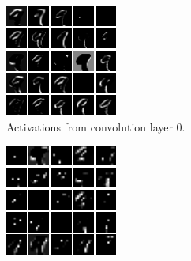 \documentclass{article}
\begin{document}
\begin{figure}[h!]
    \centering
    \begin{subfigure}[t]{0.3\textwidth}
        \centering
        \includegraphics[width=\textwidth]{./plots/activation9_0.png}
        \caption{Activations from convolution layer 0.}
        \label{fig:subfig19a}
    \end{subfigure}
    \hfill
    \begin{subfigure}[t]{0.3\textwidth}
        \centering
        \includegraphics[width=\textwidth]{./plots/activation9_1.png}

\end{subfigure}
\end{figure}
\end{document}
